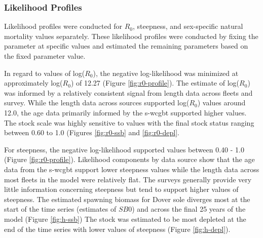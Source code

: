 \documentclass[11pt,
  english,
  a4paper,
]{article}
\begin{document}
\leavevmode\tagmcend\tagstructend\par


\hypertarget{likelihood-profiles}{%
\subsubsection{Likelihood Profiles}\label{likelihood-profiles}}

\leavevmode\tagmcend\tagstructend


Likelihood profiles were conducted for {\(R_0\)\leavevmode\tagmcend\tagstructend}, steepness, and sex-specific natural mortality values separately. These likelihood profiles were conducted by fixing the parameter at specific values and estimated the remaining parameters based on the fixed parameter value.

\leavevmode\tagmcend\tagstructend\par


In regard to values of log({\(R_0\)\leavevmode\tagmcend\tagstructend}), the negative log-likelihood was minimized at approximately log({\(R_0\)\leavevmode\tagmcend\tagstructend}) of 12.27 (Figure \ref{fig:r0-profile}). The estimate of log({\(R_0\)\leavevmode\tagmcend\tagstructend}) was informed by a relatively consistent signal from length data across fleets and survey. While the length data across sources supported log({\(R_0\)\leavevmode\tagmcend\tagstructend}) values around 12.0, the age data primarily informed by the \gls{s-wcgbt} supported higher values. The stock scale was highly sensitive to values with the final stock status ranging between 0.60 to 1.0 (Figures \ref{fig:r0-ssb} and \ref{fig:r0-depl}.

\leavevmode\tagmcend\tagstructend\par


For steepness, the negative log-likelihood supported values between 0.40 - 1.0 (Figure \ref{fig:r0-profile}). Likelihood components by data source show that the age data from the \gls{s-wcgbt} support lower steepness values while the length data across most fleets in the model were relatively flat. The surveys generally provide very little information concerning steepness but tend to support higher values of steepness. The estimated spawning biomass for Dover sole diverges most at the start of the time series (estimates of {\(SB0\)\leavevmode\tagmcend\tagstructend}) and across the final 25 years of the model (Figure \ref{fig:h-ssb}) The stock was estimated to be most depleted at the end of the time series with lower values of steepness (Figure \ref{fig:h-depl}).
\end{document}
